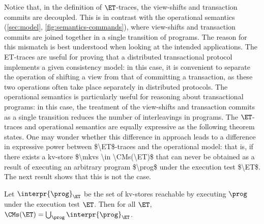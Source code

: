 Notice that, in the definition of $\ET$-traces, the view-shifts and 
transaction commits  are decoupled. This is in contrast with the
operational semantics (\cref{sec:model}, \cref{fig:semantics-commands}), 
where view-shifts and transaction commits are joined  together in a single transition of programs. 
The reason for this mismatch is best understood when looking at the
intended applications. The ET-traces are useful for 
proving that a distributed transactional 
protocol implements a given consistency model: in this case, it is convenient to separate the operation of shifting a view from that of committing a transaction, 
as these two operations often take place separately in distributed
protocols. The operational semantics  is particularly useful for  reasoning about transactional 
programs: in this case, the treatment of the view-shifts and transaction commits as a single transition reduces the number of interleavings in programs.
The $\ET$-traces and operational semantics are equally expressive as
the following theorem states. 
\ac{One may wonder whether this difference in approach leads to a difference in expressive power between $\ET$-traces 
and the operational model: that is, if there exists a kv-store $\mkvs \in \CMs(\ET)$ that can never be obtained as a 
result of executing an arbitrary program $\prog$ under the execution test $\ET$. The next result shows that 
this is not the case.}
%

\begin{theorem}
	\label{thm:ettraces2sem}
	Let $\interpr{\prog}_{\ET}$ be the set of kv-stores reachable by executing $\prog$ under the execution test $\ET$. 
    Then for all $\ET$, $\CMs(\ET) = \bigcup_{\prog} \interpr{\prog}_{\ET}$.
\end{theorem}


